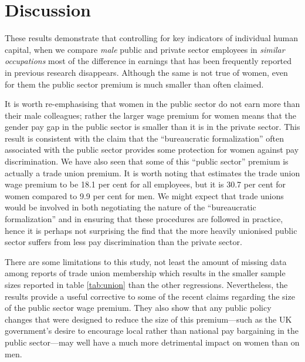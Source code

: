 \documentclass[a4paper,11pt,titlepage]{article}
\begin{document}
\section{Discussion}
These results demonstrate that controlling for key indicators of individual human capital, when we compare \emph{male} public and private sector employees in \emph{similar occupations} most of the difference in earnings that has been frequently reported in previous research disappears.  Although the same is not true of women, even for them the public sector premium is much smaller than often claimed.

It is worth re-emphasising that women in the public sector do not earn more than their male colleagues; rather the larger wage premium for women means that the gender pay gap in the public sector is smaller than it is in the private sector.  This result is consistent with the claim that the ``bureaucratic formalization'' often associated with the public sector provides some protection for women against pay discrimination.  We have also seen that some of this ``public sector'' premium is actually a trade union premium.  It is worth noting that \citet{BIS2012} estimates the trade union wage premium to be 18.1 per cent for all employees, but it is 30.7 per cent for women compared to 9.9 per cent for men.  We might expect that trade unions would be involved in both negotiating the nature of the ``bureaucratic formalization'' and in ensuring that these procedures are followed in practice, hence it is perhaps not surprising the find that the more heavily unionised public sector suffers from less pay discrimination than the private sector.

There are some limitations to this study, not least the amount of missing data among reports of trade union membership which results in the smaller sample sizes reported in table \ref{tab:union} than the other regressions.  Nevertheless, the results provide a useful corrective to some of the recent claims regarding the size of the public sector wage premium.  They also show that any public policy changes that were designed to reduce the size of this premium---such as the UK government's desire to encourage local rather than national pay bargaining in the public sector---may well have a much more detrimental impact on women than on men.

\clearpage

\end{document}
